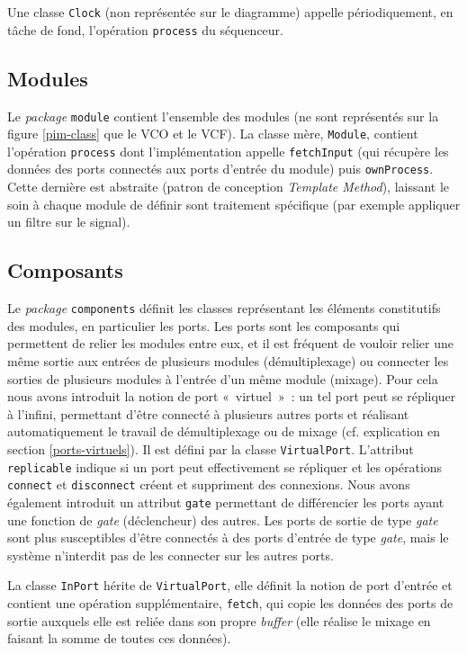 Une classe \texttt{Clock} (non représentée sur le diagramme) appelle périodiquement,
en tâche de fond, l’opération \texttt{process} du séquenceur.

\subsection{Modules}

Le \emph{package} \verb!module! contient l'ensemble des modules (ne
sont représentés sur la figure \ref{pim-class} que le VCO et le VCF). La classe
mère, \verb!Module!, contient l'opération \verb!process! dont
l'implémentation appelle \verb!fetchInput! (qui récupère les données des ports connectés aux ports d’entrée du module) puis \verb!ownProcess!.
Cette dernière est abstraite (patron de conception
\emph{Template Method}), laissant le soin à chaque module de
définir sont traitement spécifique (par exemple appliquer un filtre sur le signal).

\subsection{Composants}

Le \emph{package} \verb!components! définit les classes
représentant les éléments constitutifs des modules, en particulier
les ports. Les ports sont les composants qui permettent de relier
les modules entre eux, et il est fréquent de vouloir relier une
même sortie aux entrées de plusieurs modules (démultiplexage) ou
connecter les sorties de plusieurs modules à l'entrée d'un même
module (mixage). Pour cela nous avons introduit la notion de port
«~virtuel~»~: un tel port peut se répliquer à l'infini, permettant
d'être connecté à plusieurs autres ports et réalisant
automatiquement le travail de démultiplexage ou de mixage (cf. explication en section \ref{ports-virtuels}). Il est
défini par la classe \verb!VirtualPort!. L'attribut
\verb!replicable! indique si un port peut effectivement se
répliquer et les opérations \verb!connect! et \verb!disconnect!
créent et suppriment des connexions. Nous avons également introduit
un attribut \verb!gate! permettant de différencier les ports ayant
une fonction de \emph{gate} (déclencheur) des autres. Les ports de
sortie de type \emph{gate} sont plus susceptibles d'être connectés
à des ports d'entrée de type \emph{gate}, mais le système
n'interdit pas de les connecter sur les autres ports.

La classe \verb!InPort! hérite de \verb!VirtualPort!, elle définit
la notion de port d'entrée et contient une opération
supplémentaire, \verb!fetch!, qui copie les données des ports de
sortie auxquels elle est reliée dans son propre \emph{buffer} (elle
réalise le mixage en faisant la somme de toutes ces données).

